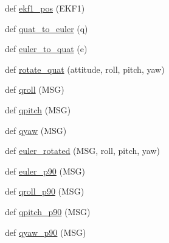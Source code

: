\begin{DoxyCompactItemize}
\item 
def \mbox{\hyperlink{namespacepymavlink_1_1mavextra_a0982fb72ae1fd1006e089debf6b98440}{ekf1\+\_\+pos}} (E\+K\+F1)
\item 
def \mbox{\hyperlink{namespacepymavlink_1_1mavextra_a60cc24d55dd20230db0faa61038e6cf7}{quat\+\_\+to\+\_\+euler}} (q)
\item 
def \mbox{\hyperlink{namespacepymavlink_1_1mavextra_afe052544879bef855464ba48b3fe55f6}{euler\+\_\+to\+\_\+quat}} (e)
\item 
def \mbox{\hyperlink{namespacepymavlink_1_1mavextra_a44f4f12a741cc819b9197e09e78b4e78}{rotate\+\_\+quat}} (attitude, roll, pitch, yaw)
\item 
def \mbox{\hyperlink{namespacepymavlink_1_1mavextra_af6a04d0089b64397af521e72dfa6f82f}{qroll}} (M\+SG)
\item 
def \mbox{\hyperlink{namespacepymavlink_1_1mavextra_abdee678a41670fcef22b100ca3ce611d}{qpitch}} (M\+SG)
\item 
def \mbox{\hyperlink{namespacepymavlink_1_1mavextra_a77216052108c7a04c334dfcb3cb24107}{qyaw}} (M\+SG)
\item 
def \mbox{\hyperlink{namespacepymavlink_1_1mavextra_a93e763e24f8b66e8051ec933eceaf449}{euler\+\_\+rotated}} (M\+SG, roll, pitch, yaw)
\item 
def \mbox{\hyperlink{namespacepymavlink_1_1mavextra_ae817df92c23b96ec6e16093c368e729b}{euler\+\_\+p90}} (M\+SG)
\item 
def \mbox{\hyperlink{namespacepymavlink_1_1mavextra_aaf860983d6c5bb5c19ddc01a98d542dd}{qroll\+\_\+p90}} (M\+SG)
\item 
def \mbox{\hyperlink{namespacepymavlink_1_1mavextra_a260bdd8eafc90dc550972d28ba227c1a}{qpitch\+\_\+p90}} (M\+SG)
\item 
def \mbox{\hyperlink{namespacepymavlink_1_1mavextra_a7c38a6a073239c53cd485cdac0df5aad}{qyaw\+\_\+p90}} (M\+SG)
\end{DoxyCompactItemize}
